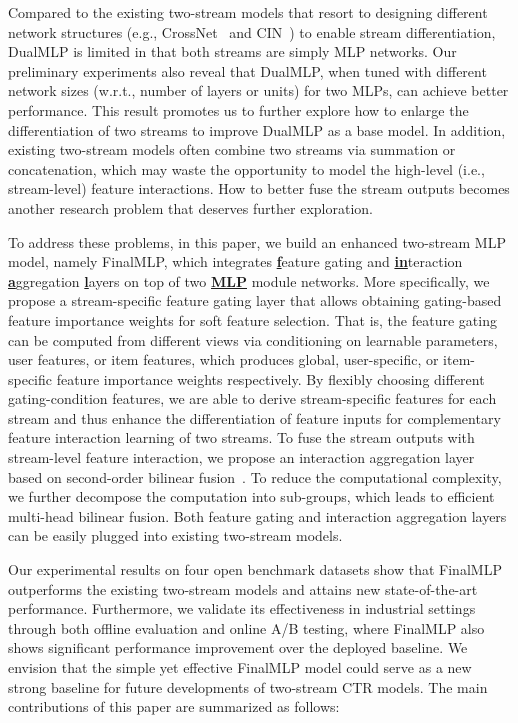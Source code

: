 \documentclass[letterpaper]{article} \usepackage{aaai23}  \usepackage{times}  \usepackage{helvet}  \usepackage{courier}  \usepackage[hyphens]{url}  \usepackage{graphicx} \urlstyle{rm} \def\UrlFont{\rm}  \usepackage{natbib}  \usepackage{caption} \frenchspacing  \setlength{\pdfpagewidth}{8.5in}  \setlength{\pdfpageheight}{11in}  \usepackage{algorithm}
\begin{document}
Compared to the existing two-stream models that resort to designing different network structures (e.g., CrossNet~\cite{DCN} and CIN~\cite{xDeepFM}) to enable stream differentiation, DualMLP is limited in that both streams are simply MLP networks. Our preliminary experiments also reveal that DualMLP, when tuned with different network sizes (w.r.t., number of layers or units) for two MLPs, can achieve better performance. This result promotes us to further explore how to enlarge the differentiation of two streams to improve DualMLP as a base model. In addition, existing two-stream models often combine two streams via summation or concatenation, which may waste the opportunity to model the high-level (i.e., stream-level) feature interactions. How to better fuse the stream outputs becomes another research problem that deserves further exploration.







To address these problems, in this paper, we build an enhanced two-stream MLP model, namely FinalMLP, which integrates \underline{\textbf{f}}eature gating and \underline{\textbf{in}}teraction \underline{\textbf{a}}ggregation \underline{\textbf{l}}ayers on top of two \underline{\textbf{MLP}} module networks. More specifically, we propose a stream-specific feature gating layer that allows obtaining gating-based feature importance weights for soft feature selection. That is, the feature gating can be computed from different views via conditioning on learnable parameters, user features, or item features, which produces global, user-specific, or item-specific feature importance weights respectively. By flexibly choosing different gating-condition features, we are able to derive stream-specific features for each stream and thus enhance the differentiation of feature inputs for complementary feature interaction learning of two streams. To fuse the stream outputs with stream-level feature interaction, we propose an interaction aggregation layer based on second-order bilinear fusion~\cite{BilinearCNN,BilinearModel}. To reduce the computational complexity, we further decompose the computation into  sub-groups, which leads to efficient multi-head bilinear fusion. Both feature gating and interaction aggregation layers can be easily plugged into existing two-stream models.

Our experimental results on four open benchmark datasets show that FinalMLP outperforms the existing two-stream models and attains new state-of-the-art performance. Furthermore, we validate its effectiveness in industrial settings through both offline evaluation and online A/B testing, where FinalMLP also shows significant performance improvement over the deployed baseline. We envision that the simple yet effective FinalMLP model could serve as a new strong baseline for future developments of two-stream CTR models. The main contributions of this paper are summarized as follows:
\end{document}
